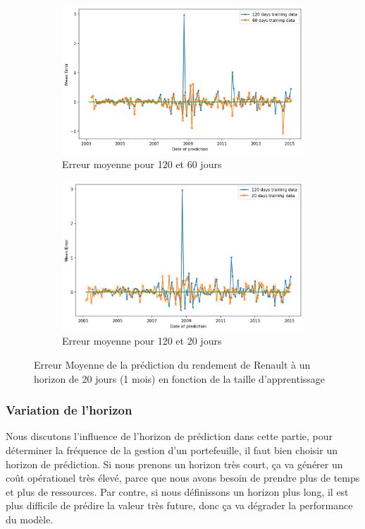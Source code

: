 \begin{figure}[H]
\centering
\begin{subfigure}{.5\textwidth}
\centering
\includegraphics[width=.9\linewidth, scale=0.2]
{plot/ME_Trainingset1.png}
\caption{Erreur moyenne pour 120 et 60 jours}
\label{fig:ME_Ts1}
\end{subfigure}%
\begin{subfigure}{.5\textwidth}
\centering
\includegraphics[width=.9\linewidth, scale=0.2]
{plot/ME_Trainingset2.png}
\caption{Erreur moyenne pour 120 et 20 jours}
\label{fig:ME_Ts2}
\end{subfigure}
\caption{Erreur Moyenne de la prédiction du rendement de Renault à un horizon de 20 jours (1 mois) en fonction de la taille d'apprentissage}
\label{fig:ME_Trainingset}
\end{figure}


\subsubsection{Variation de l'horizon}

Nous discutons l'influence de l'horizon de prédiction dans cette partie, pour déterminer la fréquence de la gestion d'un portefeuille, il faut bien choisir un horizon de prédiction. Si nous prenons un horizon très court, ça va générer un coût opérationel très élevé, parce que nous avons besoin de prendre plus de temps et plus de ressources. Par contre, si nous définissons un horizon plus long, il est plus difficile de prédire la valeur très future, donc ça va dégrader la performance du modèle. \\

